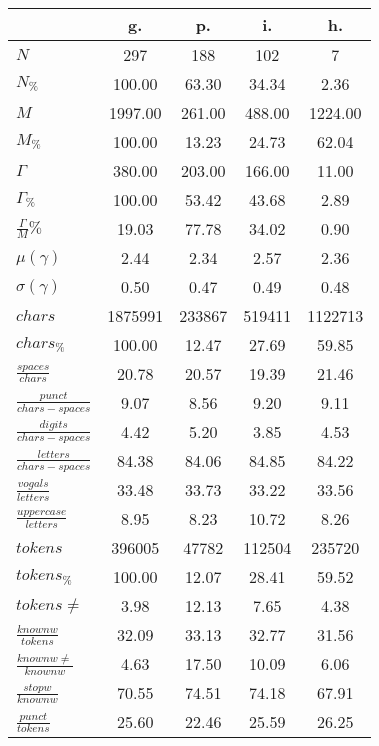 \begin{table}[h!]
\begin{center}
\begin{tabular}{| l || c | c | c | c |}\hline
 & {\bf g.} & {\bf p.} & {\bf i.} & {\bf h.} \\\hline\hline
$N$ & 297  & 188  & 102  & 7 \\
$N_{\%}$ & 100.00  & 63.30  & 34.34  & 2.36 \\\hline
$M$ & 1997.00  & 261.00  & 488.00  & 1224.00 \\
$M_{\%}$ & 100.00  & 13.23  & 24.73  & 62.04 \\\hline
$\Gamma$ & 380.00  & 203.00  & 166.00  & 11.00 \\
$\Gamma_{\%}$ & 100.00  & 53.42  & 43.68  & 2.89 \\\hline
$\frac{\Gamma}{M}\%$ & 19.03  & 77.78  & 34.02  & 0.90 \\
$\mu(\gamma)$ & 2.44  & 2.34  & 2.57  & 2.36 \\
$\sigma(\gamma)$ & 0.50  & 0.47  & 0.49  & 0.48 \\\hline\hline
$chars$ & 1875991  & 233867  & 519411  & 1122713 \\
$chars_{\%}$ & 100.00  & 12.47  & 27.69  & 59.85 \\\hline
$\frac{spaces}{chars}$ & 20.78  & 20.57  & 19.39  & 21.46 \\
$\frac{punct}{chars-spaces}$ & 9.07  & 8.56  & 9.20  & 9.11 \\
$\frac{digits}{chars-spaces}$ & 4.42  & 5.20  & 3.85  & 4.53 \\\hline
$\frac{letters}{chars-spaces}$ & 84.38  & 84.06  & 84.85  & 84.22 \\
$\frac{vogals}{letters}$ & 33.48  & 33.73  & 33.22  & 33.56 \\
$\frac{uppercase}{letters}$ & 8.95  & 8.23  & 10.72  & 8.26 \\\hline\hline
$tokens$ & 396005  & 47782  & 112504  & 235720 \\
$tokens_{\%}$ & 100.00  & 12.07  & 28.41  & 59.52 \\
$tokens \neq$ & 3.98  & 12.13  & 7.65  & 4.38 \\\hline
$\frac{knownw}{tokens}$ & 32.09  & 33.13  & 32.77  & 31.56 \\
$\frac{knownw \neq}{knownw}$ & 4.63  & 17.50  & 10.09  & 6.06 \\\hline
$\frac{stopw}{knownw}$ & 70.55  & 74.51  & 74.18  & 67.91 \\
$\frac{punct}{tokens}$ & 25.60  & 22.46  & 25.59  & 26.25 \\

\end{tabular}
\end{center}
\end{table}
